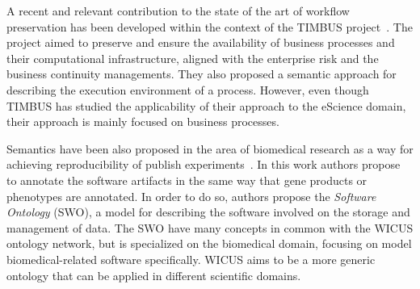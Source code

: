 A recent and relevant contribution to the state of the art of workflow preservation has been developed within the context of the TIMBUS project~\cite{Mayer2014Ontologies}. The project  aimed to preserve and ensure the availability of business processes and their computational infrastructure, aligned with the enterprise risk and the business continuity managements. They also proposed a semantic approach for describing the execution environment of a process.  However, even though TIMBUS has studied the applicability of their approach to the eScience domain, their approach is mainly focused on business processes.

Semantics have been also proposed in the area of biomedical research as a way for achieving reproducibility of publish experiments~\cite{MaloneSWO2014}. In this work authors propose to annotate the software artifacts in the same way that gene products or phenotypes are annotated. In order to do so, authors propose the {\it Software Ontology} (SWO), a model for describing the software involved on the storage and management of data. The SWO have many concepts in common with the WICUS ontology  network, but is specialized on the biomedical domain, focusing on model biomedical-related software specifically. WICUS aims to be a more generic ontology that can be applied in different scientific domains.

